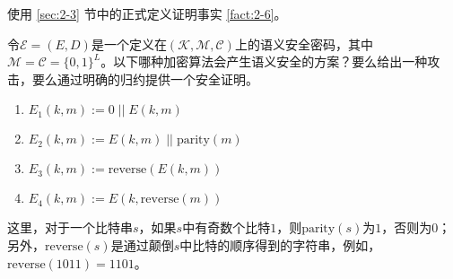 \begin{exercise}
使用 \ref{sec:2-3} 节中的正式定义证明事实 \ref{fact:2-6}。
\end{exercise}

\begin{exercise}[练习语义安全性的定义]
令$\mathcal{E}=(E,D)$是一个定义在$(\mathcal{K},\mathcal{M},\mathcal{C})$上的语义安全密码，其中$\mathcal{M}=\mathcal{C}=\{0,1\}^L$。以下哪种加密算法会产生语义安全的方案？要么给出一种攻击，要么通过明确的归约提供一个安全证明。
\begin{enumerate}[\indent(a)]
	\item $E_1(k,m):=0\;||\;E(k,m)$
	\item $E_2(k,m):=E(k,m)\;||\;\mathrm{parity}(m)$
	\item $E_3(k,m):=\mathrm{reverse}(E(k,m))$
	\item $E_4(k,m):=E(k,\mathrm{reverse}(m))$
\end{enumerate}
这里，对于一个比特串$s$，如果$s$中有奇数个比特$1$，则$\mathrm{parity}(s)$为$1$，否则为$0$；另外，$\mathrm{reverse}(s)$是通过颠倒$s$中比特的顺序得到的字符串，例如，$\mathrm{reverse}(1011)=1101$。
\end{exercise}

